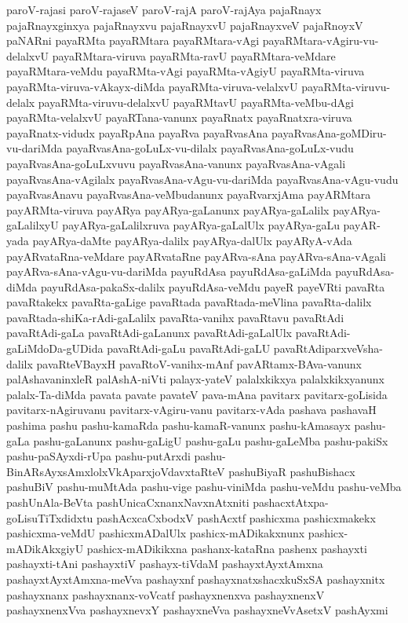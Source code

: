 {paroV-rajasi
paroV-rajaseV
paroV-rajA
paroV-rajAya
pajaRnayx
pajaRnayxginxya
pajaRnayxvu
pajaRnayxvU
pajaRnayxveV
pajaRnoyxV
paNARni
payaRMta
payaRMtara
payaRMtara-vAgi
payaRMtara-vAgiru-vu-delalxvU
payaRMtara-viruva
payaRMta-ravU
payaRMtara-veMdare
payaRMtara-veMdu
payaRMta-vAgi
payaRMta-vAgiyU
payaRMta-viruva
payaRMta-viruva-vAkayx-diMda
payaRMta-viruva-velalxvU
payaRMta-viruvu-delalx
payaRMta-viruvu-delalxvU
payaRMtavU
payaRMta-veMbu-dAgi
payaRMta-velalxvU
payaRTana-vanunx
payaRnatx
payaRnatxra-viruva
payaRnatx-vidudx
payaRpAna
payaRva
payaRvasAna
payaRvasAna-goMDiru-vu-dariMda
payaRvasAna-goLuLx-vu-dilalx
payaRvasAna-goLuLx-vudu
payaRvasAna-goLuLxvuvu
payaRvasAna-vanunx
payaRvasAna-vAgali
payaRvasAna-vAgilalx
payaRvasAna-vAgu-vu-dariMda
payaRvasAna-vAgu-vudu
payaRvasAnavu
payaRvasAna-veMbudanunx
payaRvarxjAma
payARMtara
payARMta-viruva
payARya
payARya-gaLanunx
payARya-gaLalilx
payARya-gaLalilxyU
payARya-gaLalilxruva
payARya-gaLalUlx
payARya-gaLu
payAR-yada
payARya-daMte
payARya-dalilx
payARya-dalUlx
payARyA-vAda
payARvataRna-veMdare
payARvataRne
payARva-sAna
payARva-sAna-vAgali
payARva-sAna-vAgu-vu-dariMda
payuRdAsa
payuRdAsa-gaLiMda
payuRdAsa-diMda
payuRdAsa-pakaSx-dalilx
payuRdAsa-veMdu
payeR
payeVRti
pavaRta
pavaRtakekx
pavaRta-gaLige
pavaRtada
pavaRtada-meVlina
pavaRta-dalilx
pavaRtada-shiKa-rAdi-gaLalilx
pavaRta-vanihx
pavaRtavu
pavaRtAdi
pavaRtAdi-gaLa
pavaRtAdi-gaLanunx
pavaRtAdi-gaLalUlx
pavaRtAdi-gaLiMdoDa-gUDida
pavaRtAdi-gaLu
pavaRtAdi-gaLU
pavaRtAdiparxveVsha-dalilx
pavaRteVBayxH
pavaRtoV-vanihx-mAnf
pavARtamx-BAva-vanunx
palAshavaninxleR
palAshA-niVti
palayx-yateV
palalxkikxya
palalxkikxyanunx
palalx-Ta-diMda
pavata
pavate
pavateV
pava-mAna
pavitarx
pavitarx-goLisida
pavitarx-nAgiruvanu
pavitarx-vAgiru-vanu
pavitarx-vAda
pashava
pashavaH
pashima
pashu
pashu-kamaRda
pashu-kamaR-vanunx
pashu-kAmasayx
pashu-gaLa
pashu-gaLanunx
pashu-gaLigU
pashu-gaLu
pashu-gaLeMba
pashu-pakiSx
pashu-paSAyxdi-rUpa
pashu-putArxdi
pashu-BinARsAyxsAmxlolxVkAparxjoVdavxtaRteV
pashuBiyaR
pashuBishacx
pashuBiV
pashu-muMtAda
pashu-vige
pashu-viniMda
pashu-veMdu
pashu-veMba
pashUnAla-BeVta
pashUnicaCxnanxNavxnAtxniti
pashacxtAtxpa-goLisuTiTxdidxtu
pashAcxcaCxbodxV
pashAcxtf
pashicxma
pashicxmakekx
pashicxma-veMdU
pashicxmADalUlx
pashicx-mADikakxnunx
pashicx-mADikAkxgiyU
pashicx-mADikikxna
pashanx-kataRna
pashenx
pashayxti
pashayxti-tAni
pashayxtiV
pashayx-tiVdaM
pashayxtAyxtAmxna
pashayxtAyxtAmxna-meVva
pashayxnf
pashayxnatxshacxkuSxSA
pashayxnitx
pashayxnanx
pashayxnanx-voVcatf
pashayxnenxva
pashayxnenxV
pashayxnenxVva
pashayxnevxY
pashayxneVva
pashayxneVvAsetxV
pashAyxmi
}
